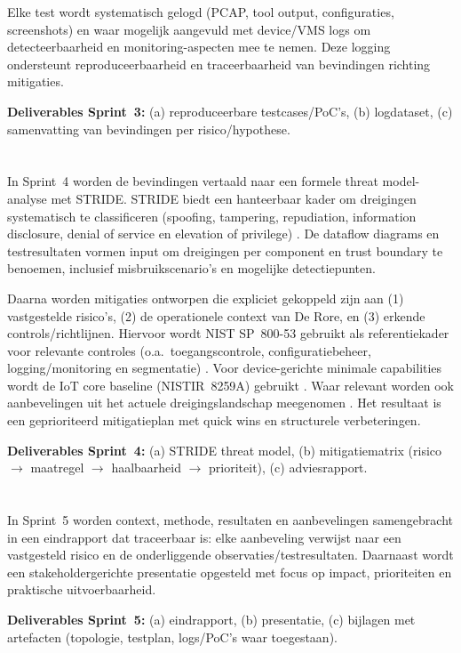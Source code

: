 Elke test wordt systematisch gelogd (PCAP, tool output, configuraties, screenshots) en waar mogelijk aangevuld met device/VMS logs om detecteerbaarheid en monitoring-aspecten mee te nemen. Deze logging ondersteunt reproduceerbaarheid en traceerbaarheid van bevindingen richting mitigaties.

\textbf{Deliverables Sprint~3:} (a) reproduceerbare testcases/PoC’s, (b) logdataset, (c) samenvatting van bevindingen per risico/hypothese.

\section{}%
\label{sec:meth-sprint4}

In Sprint~4 worden de bevindingen vertaald naar een formele threat model-analyse met STRIDE. STRIDE biedt een hanteerbaar kader om dreigingen systematisch te classificeren (spoofing, tampering, repudiation, information disclosure, denial of service en elevation of privilege) \autocite{Microsoft2022bSTRIDE}. De dataflow diagrams en testresultaten vormen input om dreigingen per component en trust boundary te benoemen, inclusief misbruikscenario’s en mogelijke detectiepunten.

Daarna worden mitigaties ontworpen die expliciet gekoppeld zijn aan (1) vastgestelde risico’s, (2) de operationele context van De Rore, en (3) erkende controls/richtlijnen. Hiervoor wordt NIST SP~800-53 gebruikt als referentiekader voor relevante controles (o.a.\ toegangscontrole, configuratiebeheer, logging/monitoring en segmentatie) \autocite{NISTSP80053r5}. Voor device-gerichte minimale capabilities wordt de IoT core baseline (NISTIR~8259A) gebruikt \autocite{fagan2020iot}. Waar relevant worden ook aanbevelingen uit het actuele dreigingslandschap meegenomen \autocite{ENISA2024ThreatLandscape}. Het resultaat is een geprioriteerd mitigatieplan met quick wins en structurele verbeteringen.

\textbf{Deliverables Sprint~4:} (a) STRIDE threat model, (b) mitigatiematrix (risico $\rightarrow$ maatregel $\rightarrow$ haalbaarheid $\rightarrow$ prioriteit), (c) adviesrapport.

\section{}%
\label{sec:meth-sprint5}

In Sprint~5 worden context, methode, resultaten en aanbevelingen samengebracht in een eindrapport dat traceerbaar is: elke aanbeveling verwijst naar een vastgesteld risico en de onderliggende observaties/testresultaten. Daarnaast wordt een stakeholdergerichte presentatie opgesteld met focus op impact, prioriteiten en praktische uitvoerbaarheid.

\textbf{Deliverables Sprint~5:} (a) eindrapport, (b) presentatie, (c) bijlagen met artefacten (topologie, testplan, logs/PoC’s waar toegestaan).